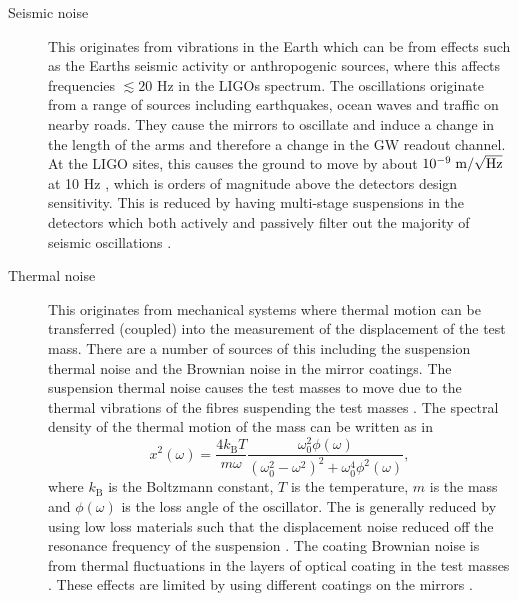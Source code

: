 \begin{description}
\item[Seismic noise] This originates from vibrations in the Earth which can be from effects such as the Earths seismic
activity or anthropogenic sources, where this affects frequencies $\lesssim 20$ Hz in the \glspl{LIGO} spectrum. The oscillations originate
from a range of sources including earthquakes, ocean waves and traffic on nearby roads. They cause the mirrors to
oscillate and induce a change
in the length of the arms and therefore a change in the \gls{GW} readout channel. 
At the \gls{LIGO} sites, this causes the ground to move by about $10^{-9}\; \rm{m}/\sqrt{\rm{Hz}}$ at 10 Hz \citep{martynov2016SensitivityAdvanced}, which is orders of magnitude above the detectors design sensitivity. 
This is reduced by having multi-stage suspensions in the detectors which both actively and passively filter out the majority of seismic oscillations
\citep{matichard2015SeismicIsolation}.


\item[Thermal noise] This originates from mechanical systems where thermal
motion can be transferred (coupled) into the measurement of the displacement of
the test mass. There are a number of sources of this including the suspension
thermal noise and the Brownian noise in the mirror coatings.  The suspension
thermal noise causes the test masses to move due to the thermal vibrations of
the fibres suspending the test masses \citep{gonzalez2007HandbookApproximation}.  
The spectral density of the thermal motion of the mass can be written as in \citep{pitkin2011GravitationalWave}
\begin{equation}
	x^2(\omega) = \frac{4k_{\text{B}}T}{m \omega }\frac{\omega_0^2 \phi(\omega)}{(\omega_0^2 - \omega^2)^2 + \omega_0^4 \phi^2(\omega)},
\end{equation}
where $k_{\text{B}}$ is the Boltzmann constant, $T$ is the temperature, $m$ is the mass and $\phi(\omega)$ is the loss angle of the oscillator.
The is generally reduced by using low loss materials such that the displacement noise reduced off the resonance frequency of the suspension \citep{hammond2012ReducingSuspension}.
The coating Brownian noise is from thermal fluctuations in the layers of optical coating in the test masses
\citep{martynov2016SensitivityAdvanced}. These effects are limited by using
different coatings on the mirrors \citep{abernathy0OverviewResearch,martin2008MeasurementsLowtemperature}.


\end{description}
